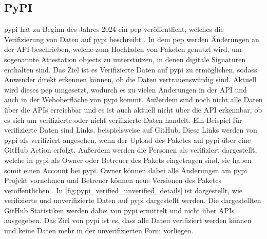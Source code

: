 \subsection{PyPI}
\label{subsec:paketverwaltung_pypi}
\gls{pypi} hat zu Beginn des Jahres 2024 ein \gls{pep} veröffentlicht, welches die Verifizierung von Daten auf \gls{pypi} beschreibt \autocite{python_software_foundation_pep_2024}.
In dem \gls{pep} werden Änderungen an der API beschrieben, welche zum Hochladen von Paketen genutzt wird, um sogenannte \glqq Attestation objects \grqq{} zu unterstützen, in denen digitale Signaturen enthalten sind.
Das Ziel ist es Verifizierte Daten auf \gls{pypi} zu ermöglichen, sodass Anwender direkt erkennen können, ob die Daten vertrauenswürdig sind.
Aktuell wird dieses \gls{pep} umgesetzt, wodurch es zu vielen Änderungen in der API und auch in der Weboberfläche von \gls{pypi} kommt.
Außerdem sind noch nicht alle Daten über die APIs erreichbar und es ist auch aktuell nicht über die API erkennbar, ob es sich um verifizierte oder nicht verifizierte Daten handelt.
Ein Beispiel für verifizierte Daten sind Links, beispielsweise auf GitHub.
Diese Links werden von \gls{pypi} als verifiziert angesehen, wenn der Upload des Paketes auf \gls{pypi} über eine GitHub Action erfolgt.
Außerdem werden die Personen als verifiziert dargestellt, welche in \gls{pypi} als Owner oder Betreuer des Pakets eingetragen sind, sie haben somit einen Account bei \gls{pypi}.
Owner können dabei alle Änderungen am \gls{pypi} Projekt vornehmen und Betreuer können neue Versionen des Paketes veröffentlichen \autocite{ingram_deprecate_2023}.
In \autoref{fig:pypi_verified_unverified_details} ist dargestellt, wie verifizierte und unverifizierte Daten auf \gls{pypi} dargestellt werden.
Die dargestellten GitHub Statistiken werden dabei von \gls{pypi} ermittelt und nicht über APIs ausgegeben.
Das Ziel von \gls{pypi} ist es, dass alle Daten verifiziert werden können und keine Daten mehr in der unverifizierten Form vorliegen.

